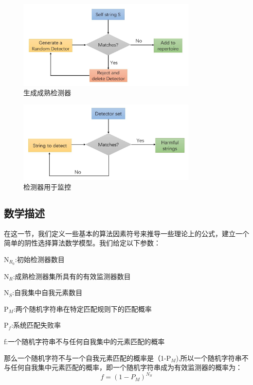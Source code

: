 \documentclass[preprint,12pt,3p]{elsarticle}
\begin{document}
\begin{figure}[hb]
  \centering
  \includegraphics[width=0.8\textwidth]{img/NSAflowchart1.jpg}
  \caption{生成成熟检测器}
\end{figure}

\begin{figure}[hb]
  \centering
  \includegraphics[width=0.8\textwidth]{img/NSAflowchart2.jpg}
  \caption{检测器用于监控}
\end{figure}

\subsection{数学描述}
\label{subsec2}
在这一节，我们定义一些基本的算法因素符号来推导一些理论上的公式，建立一个简单的阴性选择算法数学模型。我们给定以下参数：
\par
N$_{R_0}$:初始检测器数目
\par
N$_{R}$:成熟检测器集所具有的有效监测器数目 
\par
N$_{S}$:自我集中自我元素数目
\par
P$_{M}$:两个随机字符串在特定匹配规则下的匹配概率
\par
P$_{f}$:系统匹配失败率
\par
f:一个随机字符串不与任何自我集中的元素匹配的概率
\par
那么一个随机字符不与一个自我元素匹配的概率是（1-P$_{M}$),所以一个随机字符串不与任何自我集中元素匹配的概率，即一个随机字符串成为有效监测器的概率为：
\begin{equation}
    f=(1-P_{M})^{N_{S}}
\end{equation}
\end{document}
